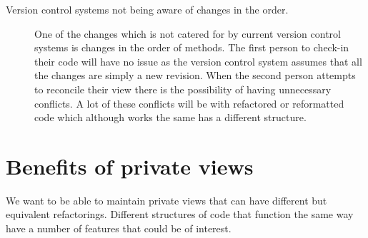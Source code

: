 \begin{description}
\item [Version control systems not being aware of changes in the order.]
One of the changes which is not catered for by current version control systems is changes in the order of methods.  The first person to check-in their code will have no issue as the version control system assumes that all the changes are simply a new revision.  When the second person attempts to reconcile their view there is the possibility of having unnecessary conflicts.  A lot of these conflicts will be with refactored or reformatted code which although works the same has a different structure.
\end{description}


\section{Benefits of private views}
We want to be able to maintain private views that can have different but equivalent refactorings. 
Different structures of code that function the same way have a number of features that could be of interest.

